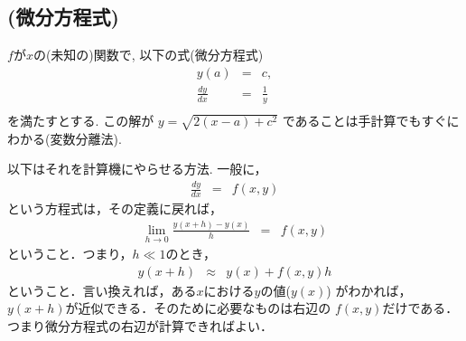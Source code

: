 \documentclass[10pt,dvipdfmx]{article}
\begin{document}

\newpage
\section{}

\subsection{{\scriptsize (微分方程式)}}
$f$が$x$の(未知の)関数で,
以下の式(微分方程式)
\begin{eqnarray}
y(a) & = & c, \\
\frac{dy}{dx} & = & \frac{1}{y} \\
\end{eqnarray}
を満たすとする. 
この解が $y = \sqrt{2 (x - a) + c^2}$ 
であることは手計算でもすぐにわかる(変数分離法).

以下はそれを計算機にやらせる方法. 一般に，
\begin{eqnarray}
\frac{dy}{dx} & = & f(x ,y)
\end{eqnarray}
という方程式は，その定義に戻れば，
\begin{eqnarray}
\lim_{h\rightarrow 0} \frac{y(x + h) - y(x)}{h} & = & f(x,y)
\end{eqnarray}
ということ．つまり，$h \ll 1$のとき，
\begin{eqnarray}
y(x + h) & \approx & y(x) + f(x, y) h
\label{eq:ord}
\end{eqnarray}
ということ．言い換えれば，ある$x$における$y$の値($y(x)$)
がわかれば，$y(x + h)$が近似できる．そのために必要なものは右辺の
$f(x, y)$だけである．つまり微分方程式の右辺が計算できればよい．
\end{document}
